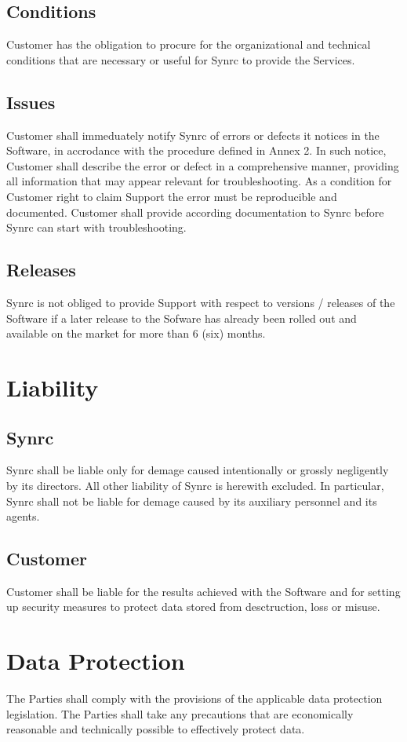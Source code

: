 \documentclass[11pt,oneside]{article}
\begin{document}
\subsection{Conditions}
Customer has the obligation to procure for the organizational and technical
conditions that are necessary or useful for Synrc to provide the Services.
\subsection{Issues}
Customer shall immeduately notify Synrc of errors or defects it notices in
the Software, in accrodance with the procedure defined in Annex 2. In such notice,
Customer shall describe the error or defect in a comprehensive manner,
providing all information that may appear relevant for troubleshooting. As a
condition for Customer right to claim Support the error must be
reproducible and documented. Customer shall provide according documentation
to Synrc before Synrc can start with troubleshooting.
\subsection{Releases}
Synrc is not obliged to provide Support with respect to versions / releases
of the Software if a later release to the Sofware has already been rolled out
and available on the market for more than 6 (six) months.

\newpage
\section{Liability}
\subsection{Synrc}
Synrc shall be liable only for demage caused intentionally or grossly
negligently by its directors. All other liability of Synrc is herewith excluded.
In particular, Synrc shall not be liable for demage caused by its auxiliary
personnel and its agents.
\subsection{Customer}
Customer shall be liable for the results achieved with the Software and for
setting up security measures to protect data stored from desctruction, loss or misuse.

\section{Data Protection}
The Parties shall comply with the provisions of the applicable data protection legislation.
The Parties shall take any precautions that are economically reasonable and technically
possible to effectively protect data.
\end{document}
